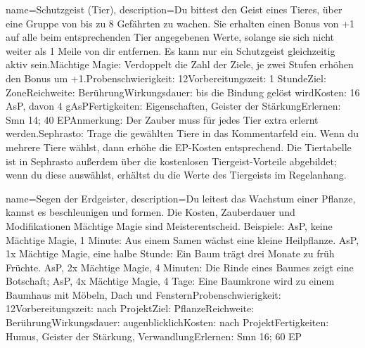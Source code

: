 {
    name={Schutzgeist (Tier)},
    description={Du bittest den Geist eines Tieres, über eine Gruppe von bis zu 8 Gefährten zu wachen. Sie erhalten einen Bonus von +1 auf alle beim entsprechenden Tier angegebenen Werte, solange sie sich nicht weiter als 1 Meile von dir entfernen. Es kann nur ein Schutzgeist gleichzeitig aktiv sein.\newline Mächtige Magie: Verdoppelt die Zahl der Ziele, je zwei Stufen erhöhen den Bonus um +1.\newline Probenschwierigkeit: 12\newline Vorbereitungszeit: 1 Stunde\newline Ziel: Zone\newline Reichweite: Berührung\newline Wirkungsdauer: bis die Bindung gelöst wird\newline Kosten: 16 AsP, davon 4 gAsP\newline Fertigkeiten: Eigenschaften, Geister der Stärkung\newline Erlernen: Smn 14; 40 EP\newline Anmerkung: Der Zauber muss für jedes Tier extra erlernt werden.\newline Sephrasto: Trage die gewählten Tiere in das Kommentarfeld ein. Wenn du mehrere Tiere wählst, dann erhöhe die EP-Kosten entsprechend. Die Tiertabelle ist in Sephrasto außerdem über die kostenlosen Tiergeist-Vorteile abgebildet; wenn du diese auswählst, erhältst du die Werte des Tiergeists im Regelanhang.}
}


{
    name={Segen der Erdgeister},
    description={Du leitest das Wachstum einer Pflanze, kannst es beschleunigen und formen. Die Kosten, Zauberdauer und Modifikationen Mächtige Magie sind Meisterentscheid. Beispiele: AsP, keine Mächtige Magie, 1 Minute: Aus einem Samen wächst eine kleine Heilpflanze. AsP, 1x Mächtige Magie, eine halbe Stunde: Ein Baum trägt drei Monate zu früh Früchte. AsP, 2x Mächtige Magie, 4 Minuten: Die Rinde eines Baumes zeigt eine Botschaft; AsP, 4x Mächtige Magie, 4 Tage: Eine Baumkrone wird zu einem Baumhaus mit Möbeln, Dach und Fenstern\newline Probenschwierigkeit: 12\newline Vorbereitungszeit: nach Projekt\newline Ziel: Pflanze\newline Reichweite: Berührung\newline Wirkungsdauer: augenblicklich\newline Kosten: nach Projekt\newline Fertigkeiten: Humus, Geister der Stärkung, Verwandlung\newline Erlernen: Smn 16; 60 EP}
}


